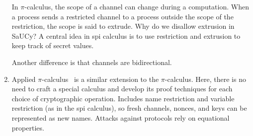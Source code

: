 \begin{enumerate}[leftmargin=*]
    In $\pi$-calculus, the scope of a channel can change during a
    computation. When a process sends a restricted channel to a process outside
    the scope of the restriction, the scope is said to extrude. Why do we
    disallow extrusion in SaUCy? A central idea in spi calculus is to use
    restriction and extrusion to keep track of secret values.

    Another difference is that channels are bidirectional. 
  \item Applied $\pi$-calculus~\cite{abadi2001mobile} is a similar extension to
    the $\pi$-calculus. Here, there is no need to craft a special calculus and
    develop its proof techniques for each choice of cryptographic
    operation. Includes name restriction and variable restriction (as in the spi
    calculus), so fresh channels, nonces, and keys can be represented as new
    names. Attacks against protocols rely on equational properties.


\end{enumerate}
